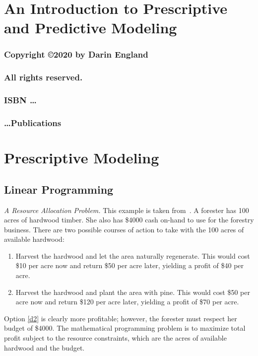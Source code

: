 \documentclass[12pt]{book}
\begin{document}
\frontmatter
%
\chapter*{\Huge \center An Introduction to Prescriptive and Predictive Modeling }
\thispagestyle{empty}
\newpage
\subsection*{\center \normalsize Copyright \copyright 2020 by Darin England}
\subsection*{\center \normalsize All rights reserved.}
\subsection*{\center \normalsize ISBN \dots}
\subsection*{\center \normalsize \dots Publications}
%
%
\tableofcontents
%
\mainmatter
%
\chapter{Prescriptive Modeling}
\section{Linear Programming}

\emph{A Resource Allocation Problem.} This example is taken 
from~\cite{chvatal:1983}.  A forester has 100
acres of hardwood timber. She also has \$4000 cash on-hand to use for
the forestry business. There are two possible courses of action to
take with the 100 acres of available hardwood:
\begin{enumerate}
\item Harvest the hardwood and let the area naturally regenerate. This
  would cost \$10 per acre now and return \$50 per acre later,
  yielding a profit of \$40 per acre.
\item Harvest the hardwood and plant the area with pine. This would
  cost \$50 per acre now and return \$120 per acre later, yielding a
  profit of \$70 per acre. \label{d2}
\end{enumerate}
Option \ref{d2} is clearly more profitable; however, the forester must
respect her budget of \$4000. The mathematical programming problem is
to maximize total profit subject to the resource constraints, which
are the acres of available hardwood and the budget.
\end{document}
